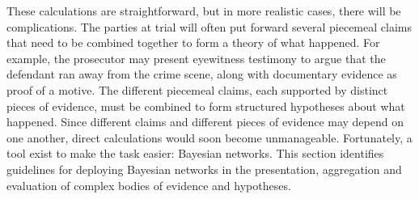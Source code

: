 \documentclass{article}
\begin{document}
These calculations are straightforward, but 
in more realistic cases, there will be complications. The parties at trial will often put forward several piecemeal claims that 
need to be combined together to form a theory of what happened.  For example, the prosecutor may present eyewitness testimony to argue that the defendant ran away from the crime scene, along with documentary evidence as proof of a motive.  
The different piecemeal claims, each supported by  distinct pieces of evidence, must be combined to form structured hypotheses about what happened. Since  different claims and different 
pieces of evidence may depend on one another, 
direct  calculations would soon become unmanageable.  Fortunately, a tool exist to make the task easier: Bayesian networks. %
%
%
This section identifies guidelines for deploying Bayesian networks in the presentation, aggregation and evaluation of complex bodies of evidence and 
hypotheses. 




 
\end{document}

